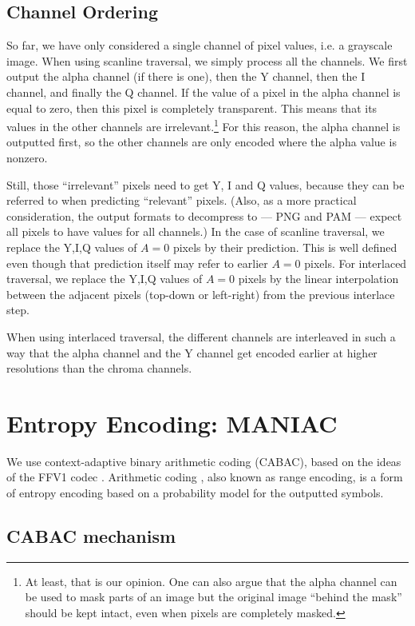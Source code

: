 \documentclass[a4paper,USenglish]{lipics}
\begin{document}
\subsection{Channel Ordering}
So far, we have only considered a single channel of pixel values, i.e. a grayscale image.
When using scanline traversal, we simply process all the channels. We first output the alpha channel (if there is one),
then the Y channel, then the I channel, and finally the Q channel.
If the value of a pixel in the alpha channel is equal to zero, then this pixel is completely transparent. This means that
its values in the other channels are irrelevant.\footnote{At least, that is our opinion. One can also argue that the alpha channel
can be used to mask parts of an image but the original image ``behind the mask'' should be kept intact, even when pixels are completely masked.}
For this reason, the alpha channel is outputted first, so the other channels are only encoded where the alpha value is nonzero.

Still, those ``irrelevant'' pixels need to get Y, I and Q values, because they can be referred to when predicting ``relevant'' pixels.
(Also, as a more practical consideration, the output formats to decompress to --- PNG and PAM --- expect all pixels to have values for all channels.)
In the case of scanline traversal, we replace the Y,I,Q values of $A=0$ pixels by their prediction. This is well defined even though
that prediction itself may refer to earlier $A=0$ pixels.
For interlaced traversal, we replace the Y,I,Q values of $A=0$ pixels by the linear interpolation between the adjacent pixels (top-down or left-right)
from the previous interlace step.

When using interlaced traversal, the different channels are interleaved in such a way that the alpha channel and the Y channel
get encoded earlier at higher resolutions than the chroma channels.


\section{Entropy Encoding: MANIAC}
\label{sec:rac}

We use context-adaptive binary arithmetic coding (CABAC), based on the ideas of
the FFV1 codec \cite{FFV1}.
Arithmetic coding \cite{ArithmeticCoding}, also known as range encoding,
is a form of entropy encoding based on a probability model for the outputted symbols.


\subsection{CABAC mechanism}
\end{document}

